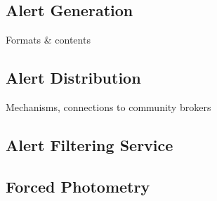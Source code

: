 
\subsection{Alert Generation}

Formats \& contents

\subsection{Alert Distribution}

Mechanisms, connections to community brokers

\subsection{Alert Filtering Service}

\subsection{Forced Photometry}